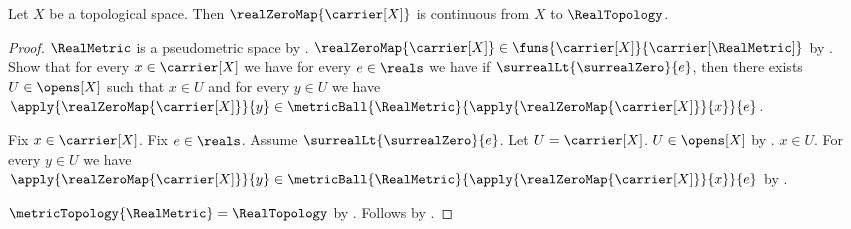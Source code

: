 \begin{theorem}\label{real_zero_map_continuous}
    Let $X$ be a topological space.
    Then $\realZeroMap{\carrier[X]}$ is continuous from $X$ to
        $\RealTopology$.
\end{theorem}
\begin{proof}
    $\RealMetric$ is a pseudometric space by
        .
    $\realZeroMap{\carrier[X]}\in
        \funs{\carrier[X]}{\carrier[\RealMetric]}$
        by
        .
    Show that for every $x\in\carrier[X]$ we have
        for every $e\in\reals$ we have if
            $\surrealLt{\surrealZero}{e}$, then there exists
            $U\in\opens[X]$ such that $x\in U$ and
            for every $y\in U$ we have
                $\apply{\realZeroMap{\carrier[X]}}{y}
                    \in\metricBall{\RealMetric}
                        {\apply{\realZeroMap{\carrier[X]}}{x}}{e}$.
    \begin{subproof}
        Fix $x\in\carrier[X]$.
        Fix $e\in\reals$.
        Assume $\surrealLt{\surrealZero}{e}$.
        Let $U=\carrier[X]$.
        $U\in\opens[X]$ by .
        $x\in U$.
        For every $y\in U$ we have
            $\apply{\realZeroMap{\carrier[X]}}{y}
                \in\metricBall{\RealMetric}
                    {\apply{\realZeroMap{\carrier[X]}}{x}}{e}$
            by
            .
    \end{subproof}
    $\metricTopology{\RealMetric}=\RealTopology$
        by .
    Follows by .
\end{proof}

